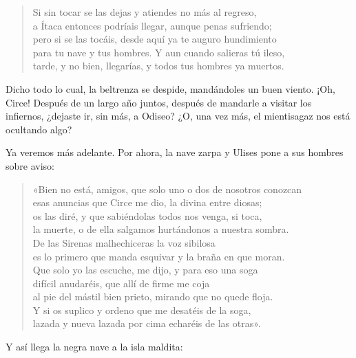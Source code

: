 \begin{verse}
Si sin tocar se las dejas y atiendes no más al regreso,\\
a Ítaca entonces podríais llegar, aunque penas sufriendo;\\
pero si se las tocáis, desde aquí ya te auguro hundimiento\\
para tu nave y tus hombres. Y aun cuando salieras tú ileso,\\
tarde, y no bien, llegarías, y todos tus hombres ya muertos.
\end{verse}

Dicho todo lo cual, la beltrenza se despide, mandándoles un buen viento. ¡Oh, Circe! Después de un largo año juntos, después de mandarle a visitar los infiernos, ¿dejaste ir, sin más, a Odiseo? ¿O, una vez más, el mientisagaz nos está ocultando algo?

Ya veremos más adelante. Por ahora, la nave zarpa y Ulises pone a sus hombres sobre aviso:

\begin{verse}
«Bien no está, amigos, que solo uno o dos de nosotros conozcan\\
esas anuncias que Circe me dio, la divina entre diosas;\\
os las diré, y que sabiéndolas todos nos venga, si toca,\\
la muerte, o de ella salgamos hurtándonos a nuestra sombra.\\
De las Sirenas malhechiceras la voz sibilosa\\
es lo primero que manda esquivar y la braña en que moran.\\
Que solo yo las escuche, me dijo, y para eso una soga\\
difícil anudaréis, que allí de firme me coja\\
al pie del mástil bien prieto, mirando que no quede floja.\\
Y si os suplico y ordeno que me desatéis de la soga,\\
lazada y nueva lazada por cima echaréis de las otras».
\end{verse}

Y así llega la negra nave a la isla maldita:

